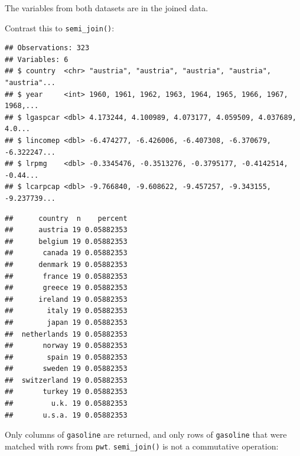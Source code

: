 \documentclass[]{gitbook}
\newenvironment{Shaded}{\begin{snugshade}}{\end{snugshade}}
\newcommand{\DataTypeTok}[1]{\textcolor[rgb]{0.13,0.29,0.53}{#1}}
\newcommand{\KeywordTok}[1]{\textcolor[rgb]{0.13,0.29,0.53}{\textbf{#1}}}
\newcommand{\NormalTok}[1]{#1}
\newcommand{\OperatorTok}[1]{\textcolor[rgb]{0.81,0.36,0.00}{\textbf{#1}}}
\newcommand{\StringTok}[1]{\textcolor[rgb]{0.31,0.60,0.02}{#1}}
\theoremstyle{definition}
\theoremstyle{definition}
\theoremstyle{definition}
\theoremstyle{remark}
\begin{document}
The variables from both datasets are in the joined data.

Contrast this to \texttt{semi\_join()}:

\begin{Shaded}
\end{Shaded}

\begin{verbatim}
## Observations: 323
## Variables: 6
## $ country  <chr> "austria", "austria", "austria", "austria", "austria"...
## $ year     <int> 1960, 1961, 1962, 1963, 1964, 1965, 1966, 1967, 1968,...
## $ lgaspcar <dbl> 4.173244, 4.100989, 4.073177, 4.059509, 4.037689, 4.0...
## $ lincomep <dbl> -6.474277, -6.426006, -6.407308, -6.370679, -6.322247...
## $ lrpmg    <dbl> -0.3345476, -0.3513276, -0.3795177, -0.4142514, -0.44...
## $ lcarpcap <dbl> -9.766840, -9.608622, -9.457257, -9.343155, -9.237739...
\end{verbatim}

\begin{Shaded}
\end{Shaded}

\begin{verbatim}
##      country  n    percent
##      austria 19 0.05882353
##      belgium 19 0.05882353
##       canada 19 0.05882353
##      denmark 19 0.05882353
##       france 19 0.05882353
##       greece 19 0.05882353
##      ireland 19 0.05882353
##        italy 19 0.05882353
##        japan 19 0.05882353
##  netherlands 19 0.05882353
##       norway 19 0.05882353
##        spain 19 0.05882353
##       sweden 19 0.05882353
##  switzerland 19 0.05882353
##       turkey 19 0.05882353
##         u.k. 19 0.05882353
##       u.s.a. 19 0.05882353
\end{verbatim}

Only columns of \texttt{gasoline} are returned, and only rows of
\texttt{gasoline} that were matched with rows from \texttt{pwt}.
\texttt{semi\_join()} is not a commutative operation:
\end{document}
